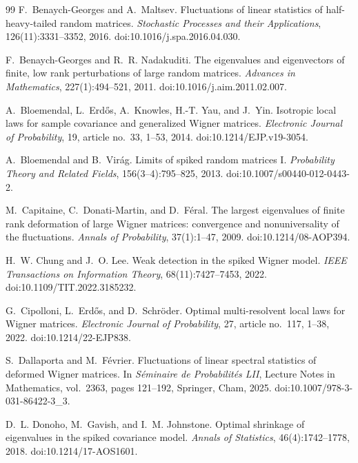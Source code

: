 \documentclass[11pt]{article}
\theoremstyle{definition}
\theoremstyle{remark}
\begin{document}
\begin{thebibliography}{99}
F.~Benaych-Georges and A.~Maltsev.
\newblock Fluctuations of linear statistics of half-heavy-tailed random matrices.
\newblock \emph{Stochastic Processes and their Applications}, 126(11):3331--3352, 2016.
\newblock doi:10.1016/j.spa.2016.04.030.

F.~Benaych-Georges and R.~R. Nadakuditi.
\newblock The eigenvalues and eigenvectors of finite, low rank perturbations of large random matrices.
\newblock \emph{Advances in Mathematics}, 227(1):494--521, 2011.
\newblock doi:10.1016/j.aim.2011.02.007.

A.~Bloemendal, L.~Erd\H{o}s, A.~Knowles, H.-T. Yau, and J.~Yin.
\newblock Isotropic local laws for sample covariance and generalized Wigner matrices.
\newblock \emph{Electronic Journal of Probability}, 19, article no.~33,
1--53, 2014.
\newblock doi:10.1214/EJP.v19-3054.

A.~Bloemendal and B.~Vir\'{a}g.
\newblock Limits of spiked random matrices I.
\newblock \emph{Probability Theory and Related Fields}, 156(3--4):795--825, 2013.
\newblock doi:10.1007/s00440-012-0443-2.

M.~Capitaine, C.~Donati-Martin, and D.~F\'{e}ral.
\newblock The largest eigenvalues of finite rank deformation of large Wigner matrices: convergence and nonuniversality of the fluctuations.
\newblock \emph{Annals of Probability}, 37(1):1--47, 2009.
\newblock doi:10.1214/08-AOP394.

H.~W. Chung and J.~O. Lee.
\newblock Weak detection in the spiked Wigner model.
\newblock \emph{IEEE Transactions on Information Theory}, 68(11):7427--7453, 2022.
\newblock doi:10.1109/TIT.2022.3185232.

G.~Cipolloni, L.~Erd\H{o}s, and D.~Schr\"oder.
\newblock Optimal multi-resolvent local laws for Wigner matrices.
\newblock \emph{Electronic Journal of Probability}, 27, article no.~117,
1--38, 2022.
\newblock doi:10.1214/22-EJP838.

S.~Dallaporta and M.~F\'{e}vrier.
\newblock Fluctuations of linear spectral statistics of deformed Wigner matrices.
\newblock In \emph{S\'{e}minaire de Probabilit\'{e}s LII}, Lecture Notes in
Mathematics, vol.~2363, pages 121--192, Springer, Cham, 2025.
\newblock doi:10.1007/978-3-031-86422-3\_3.

D.~L. Donoho, M.~Gavish, and I.~M. Johnstone.
\newblock Optimal shrinkage of eigenvalues in the spiked covariance model.
\newblock \emph{Annals of Statistics}, 46(4):1742--1778, 2018.
\newblock doi:10.1214/17-AOS1601.


\end{thebibliography}
\end{document}
